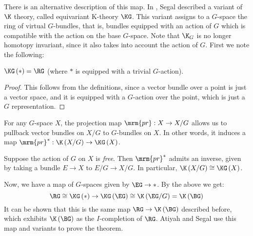 There is an alternative description of this map.
In \cite{Seg}, Segal described a variant of$\K$ theory, called equivariant K-theory $\KG$.
This variant assigns to a $G$-space the ring of virtual $G$-bundles, that is, bundles equipped with an action of $G$ which is compatible with the action on the base $G$-space.
Note that $\K_G$ is no longer homotopy invariant, since it also takes into account the action of $G$.
First we note the following:

\begin{proposition}
	$\KG\left(*\right) = \RG$ (where $*$ is equipped with a trivial $G$-action).
\end{proposition}

\begin{proof}
	This follows from the definitions, since a vector bundle over a point is just a vector space, and it is equipped with a $G$-action over the point, which is just a $G$ representation.
\end{proof}

For any $G$-space $X$, the projection map $\mrm{pr}: X \to X/G$ allows us to pullback vector bundles on $X/G$ to $G$-bundles on $X$.
In other words, it induces a map $\mrm{pr}^*: \K\left(X/G\right) \to \KG\left(X\right)$.

\begin{proposition}
	Suppose the action of $G$ on $X$ is \emph{free}. Then $\mrm{pr}^*$ admits an inverse, given by taking a bundle $E \to X$ to $E/G \to X/G$.
	In particular, $\K\left(X/G\right) \cong \KG\left(X\right)$.
\end{proposition}

Now, we have a map of $G$-spaces given by $\EG \to *$.
By the above we get:
$$
\RG
\cong \KG\left(*\right)
\to \KG\left(\EG\right)
\cong \K\left(\EG/G\right)
= \K\left(\BG\right)
$$
It can be shown that this is the same map $\RG \to \K\left(\BG\right)$ described before, which exhibits $\K\left(\BG\right)$ as the $I$-completion of $\RG$.
Atiyah and Segal use this map and variants to prove the theorem.

